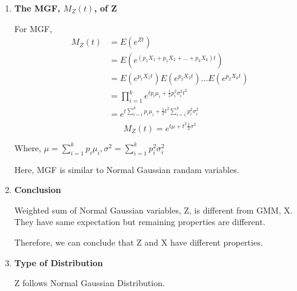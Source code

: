 \documentclass[12pt]{article}
\begin{document}
\begin{enumerate}
    \item \textbf{The MGF, $M_Z(t)$, of Z}

For MGF,
\begin{equation}
    \begin{split}
        M_Z(t)& = E(e^{Zt}) \\
        & = E(e^{(p_1X_1+p_1X_2+\dots+p_kX_k)t}) \\
        & = E(e^{p_1X_1t})E(e^{p_2X_2t})\dots E(e^{p_2X_kt}) \\
        & = \prod_{i=1}^k e^{tp_i\mu_i+\frac{1}{2}p_i^2\sigma^2_it^2} \\
        & = e^{t\sum_{i=1}^kp_i\mu_i + \frac{1}{2}t^2\sum_{i=1}^kp_i^2\sigma^2_i} \\
    \end{split}
\end{equation}
\begin{equation}
    M_Z(t) = e^{t\mu+t^2\frac{1}{2}\sigma^2}
\end{equation}
\begin{center}
    Where,  
          $\mu = \sum_{i=1}^kp_i\mu_i,   \sigma^2 = \sum_{i=1}^kp_i^2\sigma^2_i$
\end{center}

Here, MGF is similar to Normal Gaussian randam variables.
    \item \textbf{Conclusion}

Weighted sum of Normal Gaussian variables, Z, is different from GMM, X. They have same expectation but remaining properties are different.

Therefore, we can conclude that Z and X have different properties.

    \item \textbf{Type of Distribution}

Z follows Normal Gaussian Distribution.
\end{enumerate}
\end{document}

